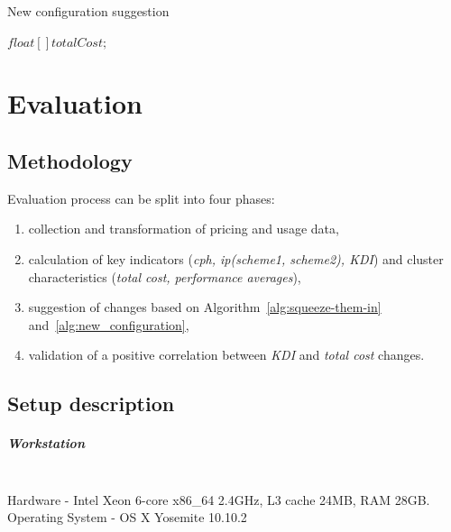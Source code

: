 \documentclass[]{final_report}
\newcommand{\myparagraph}[1]{\paragraph{#1}\mbox{}\\}
\begin{document}
\begin{algorithm}[h]
\caption{New configuration suggestion}
\label{alg:new_configuration}
 \algrenewcommand{}
 \algrenewcommand{}

  $float[ ] totalCost;$


\end{algorithm}




\chapter{Evaluation}

\section{Methodology}

Evaluation process can be split into four phases:
\begin{enumerate}
\item collection and transformation of pricing and usage data,
\item calculation of key indicators (\textit{cph, ip(scheme1, scheme2), KDI}) and cluster characteristics (\textit{total cost, performance averages}), 
\item suggestion of changes based on Algorithm~\ref{alg:squeeze-them-in} and~\ref{alg:new_configuration},
\item validation of a positive correlation between \textit{KDI} and \textit{total cost} changes.
\end{enumerate}

\section{Setup description}

\myparagraph{Workstation}
Hardware - Intel Xeon 6-core x86\_64 2.4GHz, L3 cache 24MB, RAM 28GB. \\
Operating System - OS X Yosemite 10.10.2
\end{document}
